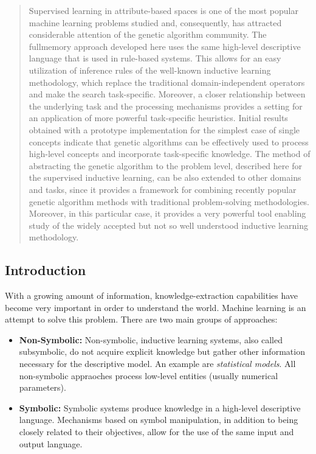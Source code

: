 \documentclass[../main.tex]{subfiles}
\begin{document}
\begin{mdframed}
\end{mdframed}

\begin{abstract}
Supervised learning in attribute-based spaces is one of the most popular machine learning problems studied and,
consequently, has attracted considerable attention of the genetic algorithm community. The fullmemory approach
developed here uses the same high-level descriptive language that is used in rule-based systems. This allows for an
easy utilization of inference rules of the well-known inductive learning methodology, which replace the traditional
domain-independent operators and make the search task-specific. Moreover, a closer relationship between the underlying
task and the processing mechanisms provides a setting for an application of more powerful task-specific heuristics.
Initial results obtained with a prototype implementation for the simplest case of single concepts indicate that genetic
algorithms can be effectively used to process high-level concepts and incorporate task-specific knowledge. The method
of abstracting the genetic algorithm to the problem level, described here for the supervised inductive learning, can be
also extended to other domains and tasks, since it provides a framework for combining recently popular genetic
algorithm methods with traditional problem-solving methodologies. Moreover, in this particular case, it provides a very
powerful tool enabling study of the widely accepted but not so well understood inductive learning methodology.
\end{abstract}

\subsection{Introduction}

With a growing amount of information, knowledge-extraction capabilities have become very important in order to understand the world. Machine learning is an attempt to solve this problem. There are two main groups of approaches:

\begin{itemize}
	\item \textbf{Non-Symbolic:} Non-symbolic, inductive learning systems, also called subsymbolic, do not acquire explicit knowledge but gather other information necessary for the descriptive model. An example are \emph{statistical models}. All non-symbolic appraoches process low-level entities (usually numerical parameters).
	\item \textbf{Symbolic:}  Symbolic systems produce knowledge in a high-level descriptive language. Mechanisms based on symbol manipulation, in addition to being closely related to their objectives, allow for the use of the same input and output language.
\end{itemize}
\end{document}

